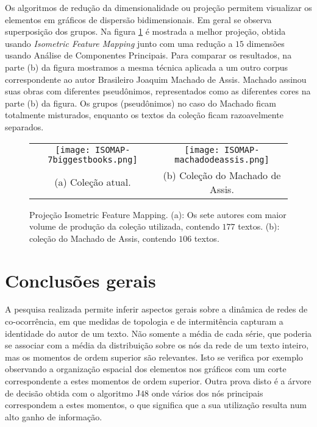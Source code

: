 \documentclass[a4paper,openright,12pt]{report} %
\begin{document}
Os algoritmos de redu\c c\~ao da dimensionalidade ou proje\c c\~ao permitem visualizar os elementos em gr\'aficos de dispers\~ao bidimensionais. Em geral se observa superposi\c c\~ao dos grupos. Na figura \ref{fig:isomaps} \'e mostrada a melhor proje\c c\~ao, obtida usando \textit{Isometric Feature Mapping} junto com uma redu\c c\~ao a $15$ dimens\~oes usando An\'alise de Componentes Principais. Para comparar os resultados, na parte (b) da figura mostramos a mesma t\'ecnica aplicada a um outro corpus correspondente ao autor Brasileiro Joaquim Machado de Assis. Machado assinou suas obras com diferentes pseud\^onimos, representados como as diferentes cores na parte (b) da figura. Os grupos (pseud\^onimos) no caso do Machado ficam totalmente misturados, enquanto os textos da cole\c c\~ao ficam razoavelmente separados.\\

\begin{figure}[t]%
\centering
\begin{tabular}{cc}
\texttt{[image: ISOMAP-7biggestbooks.png]} &
\texttt{[image: ISOMAP-machadodeassis.png]} \\
\small{(a) Cole\c c\~ao atual.} & \small{(b) Cole\c c\~ao do Machado de Assis.}\\
\end{tabular}
\caption{Proje\c c\~ao Isometric Feature Mapping. (a): Os sete autores com maior volume de produ\c c\~ao da cole\c c\~ao utilizada, contendo $177$ textos. (b): cole\c c\~ao do Machado de Assis, contendo $106$ textos.}\label{fig:isomaps}
\end{figure}



\chapter{Conclus\~oes gerais}

A pesquisa realizada permite inferir aspectos gerais sobre a din\^amica de redes de co-ocorr\^encia, em que medidas de topologia e de intermit\^encia capturam a identidade do autor de um texto. N\~ao somente a m\'edia de cada s\'erie, que poderia se associar com a m\'edia da distribui\c c\~ao sobre os n\'os da rede de um texto inteiro, mas os momentos de ordem superior s\~ao relevantes. Isto se verifica por exemplo observando a organiza\c c\~ao espacial dos elementos nos gr\'aficos com um corte correspondente a estes momentos de ordem superior. Outra prova disto \'e a \'arvore de decis\~ao obtida com o algoritmo J$48$ onde v\'arios dos n\'os principais correspondem a estes momentos, o que significa que a sua utiliza\c c\~ao resulta num alto ganho de informa\c c\~ao.\\
\end{document}
